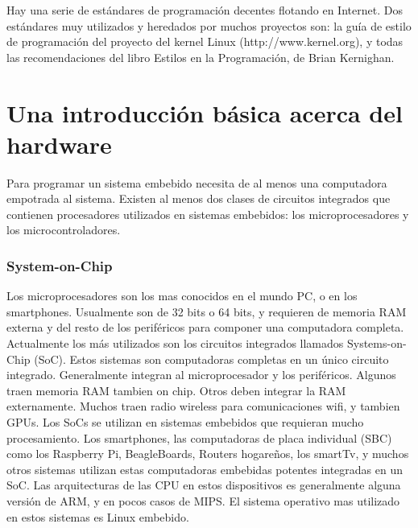 \documentclass[output=paper, 
colorlinks,
citecolor=brown,
newtxmath
]{langscibook}
\begin{document}
Hay una serie de estándares de programación decentes flotando en Internet. 
Dos estándares muy utilizados y heredados por muchos proyectos son: 
la guía de estilo de programación del proyecto del kernel Linux (http://www.kernel.org),
y todas las recomendaciones del libro Estilos en la Programación, de Brian Kernighan.




\section {Una introducción básica acerca del hardware}

Para programar un sistema embebido necesita de al menos una computadora
empotrada al sistema.
Existen al menos dos clases de circuitos integrados que contienen
procesadores utilizados en sistemas embebidos: los microprocesadores y los microcontroladores.

\subsubsection*{System-on-Chip}
Los microprocesadores son los mas conocidos en el mundo PC, o en los smartphones.
Usualmente son de 32 bits o 64 bits, y requieren de memoria RAM externa y del resto
de los periféricos para componer una computadora completa.
Actualmente los más utilizados son los circuitos integrados llamados
Systems-on-Chip (SoC). Estos sistemas son computadoras completas en un 
único circuito integrado. Generalmente integran al microprocesador
y los periféricos. Algunos traen memoria RAM tambien on chip.
Otros deben integrar la RAM externamente. Muchos traen radio
wireless para comunicaciones wifi, y tambien GPUs.
Los SoCs se utilizan en sistemas embebidos que requieran
mucho procesamiento. Los smartphones, las computadoras de placa individual
(SBC) como los Raspberry Pi, BeagleBoards, Routers hogareños, los smartTv,
y muchos otros sistemas utilizan estas computadoras embebidas potentes 
integradas en un SoC.
Las arquitecturas de las CPU en estos dispositivos es generalmente
alguna versión de ARM, y en pocos casos de MIPS.
El sistema operativo mas utilizado en estos sistemas es Linux embebido.
\end{document}
